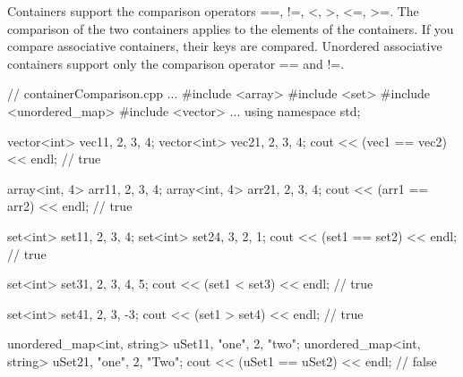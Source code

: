 Containers support the comparison operators ==, !=, <, >, <=, >=. The comparison of the two containers applies to the elements of the containers. If you compare associative containers, their keys are compared. Unordered associative containers support only the comparison operator == and !=.



\begin{cpp}
// containerComparison.cpp
...
#include <array>
#include <set>
#include <unordered_map>
#include <vector>
...
using namespace std;

vector<int> vec1{1, 2, 3, 4};
vector<int> vec2{1, 2, 3, 4};
cout << (vec1 == vec2) << endl; // true

array<int, 4> arr1{1, 2, 3, 4};
array<int, 4> arr2{1, 2, 3, 4};
cout << (arr1 == arr2) << endl; // true

set<int> set1{1, 2, 3, 4};
set<int> set2{4, 3, 2, 1};
cout << (set1 == set2) << endl; // true

set<int> set3{1, 2, 3, 4, 5};
cout << (set1 < set3) << endl; // true

set<int> set4{1, 2, 3, -3};
cout << (set1 > set4) << endl; // true

unordered_map<int, string> uSet1{{1, "one"}, {2, "two"}};
unordered_map<int, string> uSet2{{1, "one"}, {2, "Two"}};
cout << (uSet1 == uSet2) << endl; // false
\end{cpp}










